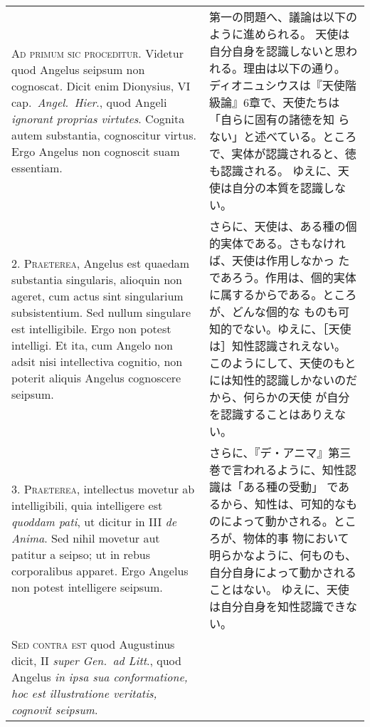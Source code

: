 \documentclass[10pt]{jsarticle} %
\begin{document}
\begin{longtable}{p{21em}p{21em}}


{\huge A}{\scshape  d primum sic proceditur}. Videtur quod
Angelus seipsum non cognoscat. Dicit enim Dionysius, VI
cap.~{\itshape Angel.~Hier}., quod Angeli {\itshape ignorant proprias virtutes}. Cognita autem
substantia, cognoscitur virtus. Ergo Angelus non cognoscit suam
essentiam.

&

 第一の問題へ、議論は以下のように進められる。
 天使は自分自身を認識しないと思われる。理由は以下の通り。
 ディオニュシウスは『天使階級論』6章で、天使たちは「自らに固有の諸徳を知
 らない」と述べている。ところで、実体が認識されると、徳も認識される。
 ゆえに、天使は自分の本質を認識しない。
 
\\


2. {\scshape  Praeterea}, Angelus est quaedam substantia
singularis, alioquin non ageret, cum actus sint singularium
subsistentium. Sed nullum singulare est intelligibile. Ergo non potest
intelligi. Et ita, cum Angelo non adsit nisi intellectiva cognitio, non
poterit aliquis Angelus cognoscere seipsum.


&

 さらに、天使は、ある種の個的実体である。さもなければ、天使は作用しなかっ
 たであろう。作用は、個的実体に属するからである。ところが、どんな個的な
 ものも可知的でない。ゆえに、［天使は］知性認識されえない。
 このようにして、天使のもとには知性的認識しかないのだから、何らかの天使
 が自分を認識することはありえない。

\\


3. {\scshape  Praeterea}, intellectus movetur ab
intelligibili, quia intelligere est {\itshape quoddam pati}, ut dicitur in III {\itshape de
Anima}. Sed nihil movetur aut patitur a seipso; ut in rebus corporalibus
apparet. Ergo Angelus non potest intelligere seipsum.


&

 さらに、『デ・アニマ』第三巻で言われるように、知性認識は「ある種の受動」
 であるから、知性は、可知的なものによって動かされる。ところが、物体的事
 物において明らかなように、何ものも、
 自分自身によって動かされることはない。
 ゆえに、天使は自分自身を知性認識できない。

\\


{\scshape Sed contra est} quod Augustinus dicit, II
{\itshape super Gen.~ad Litt}., quod Angelus {\itshape in ipsa sua conformatione, hoc est
illustratione veritatis, cognovit seipsum}.



\end{longtable}
\end{document}
